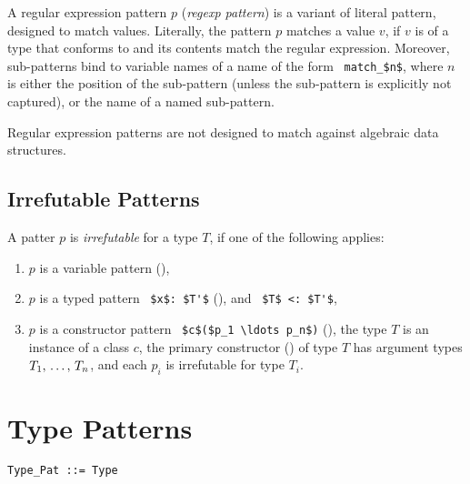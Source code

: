 A regular expression pattern $p$ ({\em regexp pattern}) is a variant of literal pattern, designed to match  values. Literally, the pattern $p $ matches a value $v$, if $v$ is of a type that conforms to  and its contents match the regular expression. Moreover, sub-patterns bind to variable names of a name of the form ~\lstinline!match_$n$!, where $n$ is either the position of the sub-pattern (unless the sub-pattern is explicitly not captured), or the name of a named sub-pattern. 

Regular expression patterns are not designed to match against algebraic data structures. 

\subsection{Irrefutable Patterns}
\label{sec:irrefutable-patterns}

A patter $p$ is {\em irrefutable} for a type $T$, if one of the following applies: 
\begin{enumerate}
\item $p$ is a variable pattern (),
\item $p$ is a typed pattern ~\lstinline!$x$: $T'$! (), and ~\lstinline!$T$ <: $T'$!,
\item $p$ is a constructor pattern ~\lstinline!$c$($p_1 \ldots p_n$)! (), the type $T$ is an instance of a class $c$, the primary constructor () of type $T$ has argument types $T_1 ,\, \ldots ,\, T_n$, and each $p_i$ is irrefutable for type $T_i$. 
\end{enumerate}






\section{Type Patterns}
\label{sec:type-patterns}

\syntax\begin{lstlisting}
Type_Pat ::= Type
\end{lstlisting}

